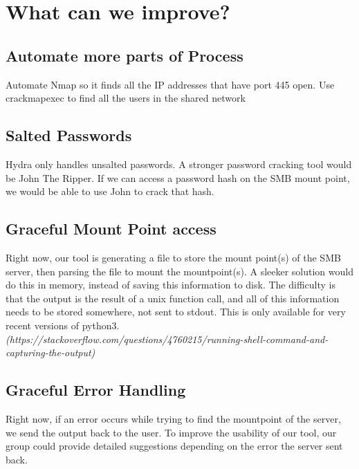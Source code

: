 \documentclass[a4paper]{article}
\begin{document}
\section{What can we improve?}
\subsection{Automate more parts of Process}
Automate Nmap so it finds all the IP addresses that have port 445 open. Use crackmapexec to find all the users in the shared network

\subsection{Salted Passwords}
Hydra only handles unsalted passwords. A stronger password cracking tool would be John The Ripper. If we can access a password hash on the SMB mount point, we would be able to use John to crack that hash.

\subsection{Graceful Mount Point access}
Right now, our tool is generating a file to store the mount point(s) of the SMB server, then parsing the file to mount the mountpoint(s). A sleeker solution would do this in memory, instead of saving this information to disk. The difficulty is that the output is the result of a unix function call, and all of this information needs to be stored somewhere, not sent to stdout. This is only available for very recent versions of python3. 
\newline\newline\small\textit{(https://stackoverflow.com/questions/4760215/running-shell-command-and-capturing-the-output)}

\subsection{Graceful Error Handling}
Right now, if an error occurs while trying to find the mountpoint of the server, we send the output back to the user. To improve the usability of our tool, our group could provide detailed suggestions depending on the error the server sent back.
\end{document}
